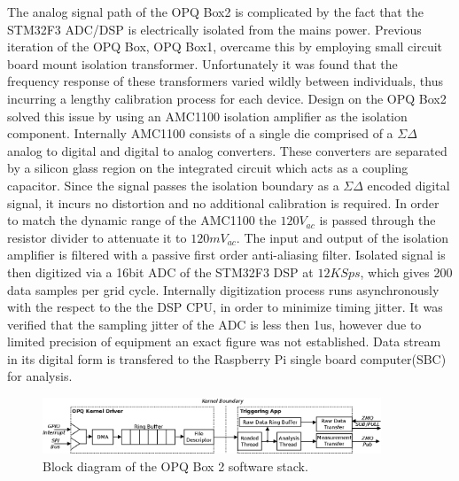 The analog signal path of the OPQ Box2 is complicated by the fact that the STM32F3 ADC/DSP is electrically isolated from the mains power. Previous iteration of the OPQ Box, OPQ Box1, overcame this by employing small circuit board mount isolation transformer. Unfortunately it was found that the frequency response of these transformers varied wildly between individuals, thus incurring a lengthy calibration process for each device. Design on the OPQ Box2 solved this issue by using an AMC1100 isolation amplifier as the isolation component. Internally AMC1100 consists of a single die comprised of a $\Sigma\Delta$ analog to digital and digital to analog converters. These converters are separated by a silicon glass region on the integrated circuit which acts as a coupling capacitor. Since the signal passes the isolation boundary as a $\Sigma\Delta$ encoded digital signal, it incurs no distortion and no additional calibration is required. In order to match the dynamic range of the AMC1100 the $120V_{ac}$ is passed through the resistor divider to attenuate it to $120mV_{ac}$. The input and output of the isolation amplifier is filtered with a passive first order anti-aliasing filter. Isolated signal is then digitized via a 16bit ADC of the STM32F3 DSP at $12 KSps$, which gives 200 data samples per grid cycle. Internally digitization process runs asynchronously with the respect to the the DSP CPU, in order to minimize timing jitter. It was verified that the sampling jitter of the ADC is less then 1us, however due to limited precision of equipment an exact figure was not established. Data stream in its digital form is transfered to the Raspberry Pi single board computer(SBC) for analysis.

\begin{figure}[h]
  \begin{center}
  \includegraphics[width=0.9\textwidth]{img/opqbox_software.png}
  \end{center}
  \caption{Block diagram of the OPQ Box 2 software stack.}
  \label{fig:3}
\end{figure}

